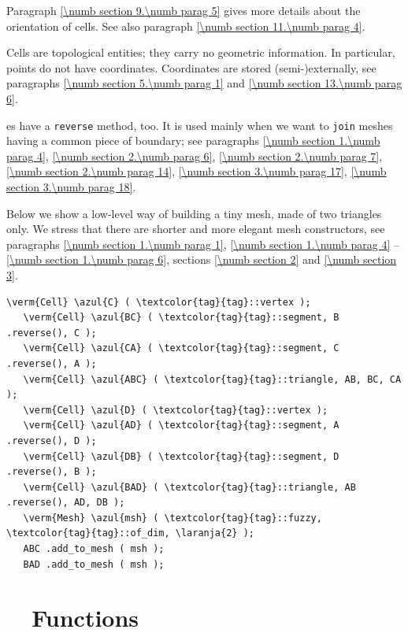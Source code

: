 Paragraph \ref{\numb section 9.\numb parag 5} gives more details about the orientation of cells.
See also paragraph \ref{\numb section 11.\numb parag 4}.

Cells are topological entities; they carry no geometric information.
In particular, points do not have coordinates.
Coordinates are stored (semi-)externally, see paragraphs \ref{\numb section 5.\numb parag 1} and
\ref{\numb section 13.\numb parag 6}.

{\small\tt {}}es have a {\small\tt reverse} method, too.
It is used mainly when we want to {\small\tt join} meshes having a common piece of boundary;
see paragraphs \ref{\numb section 1.\numb parag 4}, \ref{\numb section 2.\numb parag 6},
\ref{\numb section 2.\numb parag 7}, \ref{\numb section 2.\numb parag 14},
\ref{\numb section 3.\numb parag 17}, \ref{\numb section 3.\numb parag 18}.

Below we show a low-level way of building a tiny mesh, made of two triangles only.
We stress that there are shorter and more elegant mesh constructors, see paragraphs
\ref{\numb section 1.\numb parag 1}, \ref{\numb section 1.\numb parag 4} --
\ref{\numb section 1.\numb parag 6}, sections \ref{\numb section 2} and \ref{\numb section 3}.

\begin{Verbatim}[commandchars=\\\{\},formatcom=\small\tt,baselinestretch=0.94]
   \verm{Cell} \azul{C} ( \textcolor{tag}{tag}::vertex );
   \verm{Cell} \azul{BC} ( \textcolor{tag}{tag}::segment, B .reverse(), C );
   \verm{Cell} \azul{CA} ( \textcolor{tag}{tag}::segment, C .reverse(), A );
   \verm{Cell} \azul{ABC} ( \textcolor{tag}{tag}::triangle, AB, BC, CA );
   \verm{Cell} \azul{D} ( \textcolor{tag}{tag}::vertex );
   \verm{Cell} \azul{AD} ( \textcolor{tag}{tag}::segment, A .reverse(), D );
   \verm{Cell} \azul{DB} ( \textcolor{tag}{tag}::segment, D .reverse(), B );
   \verm{Cell} \azul{BAD} ( \textcolor{tag}{tag}::triangle, AB .reverse(), AD, DB );
   \verm{Mesh} \azul{msh} ( \textcolor{tag}{tag}::fuzzy, \textcolor{tag}{tag}::of_dim, \laranja{2} );
   ABC .add_to_mesh ( msh );
   BAD .add_to_mesh ( msh );
\end{Verbatim}


\section{~~Functions}\label{\numb section 1.\numb parag 3}

